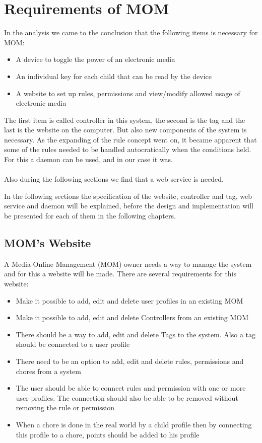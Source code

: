 \chapter{Requirements of MOM}
\label{chap:RequirMOM}

In the analysis we came to the conclusion that the following items is necessary for MOM: 
\begin{itemize}
	\item A device to toggle the power of an electronic media
	\item An individual key for each child that can be read by the device
	\item A website to set up rules, permissions and view/modify allowed usage of electronic media
\end{itemize} 


The first item is called controller in this system, the second is the tag and the last is the website on the computer. But also new components of the system is necessary. 
As the expanding of the rule concept went on, it became apparent that some of the rules needed to be handled autocratically when the conditions held. For this a daemon can be used, and in our case it was.\\
\\
Also during the following sections we find that a web service is needed. 

In the following sections the specification of the website, controller and tag, web service and daemon will be explained, before the design and implementation will be presented for each of them in the following chapters.  

\section{MOM's Website}
\label{section:momswebsite}
A Media-Online Management (MOM) owner needs a way to manage the system and for this a website will be made. There are several requirements for this website:

\begin{itemize}
	\item Make it possible to add, edit and delete user profiles in an existing MOM 
	\item Make it possible to add, edit and delete Controllers from an existing MOM
	\item There should be a way to add, edit and delete Tags to the system. Also a tag should be connected to a user profile
	\item There need to be an option to add, edit and delete rules, permissions and chores from a system
	\item The user should be able to connect rules and permission with one or more user profiles. The connection should also be able to be removed without removing the rule or permission
	\item When a chore is done in the real world by a child profile then by connecting this profile to a chore, points should be added to his profile
\end{itemize}

